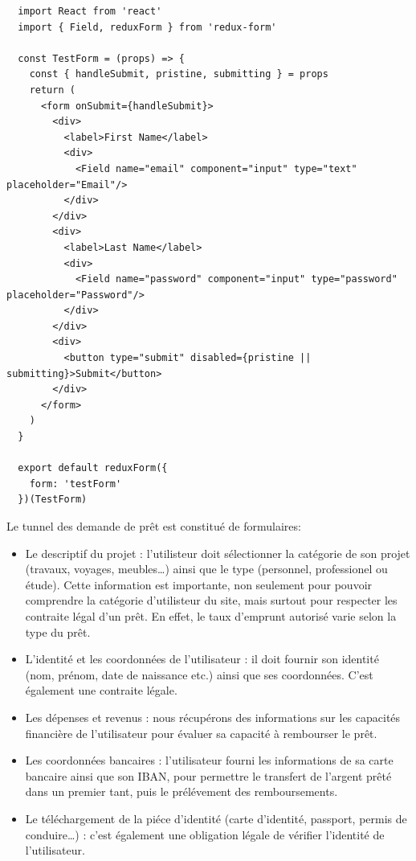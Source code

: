 \documentclass[12pt,a4paper]{article}
\providecommand{\tightlist}{%
  \setlength{\itemsep}{0pt}\setlength{\parskip}{0pt}}
\begin{document}
  \begin{verbatim}
  import React from 'react'
  import { Field, reduxForm } from 'redux-form'

  const TestForm = (props) => {
    const { handleSubmit, pristine, submitting } = props
    return (
      <form onSubmit={handleSubmit}>
        <div>
          <label>First Name</label>
          <div>
            <Field name="email" component="input" type="text" placeholder="Email"/>
          </div>
        </div>
        <div>
          <label>Last Name</label>
          <div>
            <Field name="password" component="input" type="password" placeholder="Password"/>
          </div>
        </div>
        <div>
          <button type="submit" disabled={pristine || submitting}>Submit</button>
        </div>
      </form>
    )
  }

  export default reduxForm({
    form: 'testForm'
  })(TestForm)
  \end{verbatim}

  \bigskip

  Le tunnel des demande de prêt est constitué de formulaires:

  \begin{itemize}
  \tightlist
  \item
    Le descriptif du projet : l'utilisteur doit sélectionner la catégorie
    de son projet (travaux, voyages, meubles\ldots{}) ainsi que le type
    (personnel, professionel ou étude). Cette information est importante,
    non seulement pour pouvoir comprendre la catégorie d'utilisteur du
    site, mais surtout pour respecter les contraite légal d'un prêt. En
    effet, le taux d'emprunt autorisé varie selon la type du prêt.
  \item
    L'identité et les coordonnées de l'utilisateur : il doit fournir son
    identité (nom, prénom, date de naissance etc.) ainsi que ses
    coordonnées. C'est également une contraite légale.
  \item
    Les dépenses et revenus : nous récupérons des informations sur les
    capacités financière de l'utilisateur pour évaluer sa capacité à
    rembourser le prêt.
  \item
    Les coordonnées bancaires : l'utilisateur fourni les informations de
    sa carte bancaire ainsi que son IBAN, pour permettre le transfert de
    l'argent prêté dans un premier tant, puis le prélévement des
    remboursements.
  \item
    Le téléchargement de la piéce d'identité (carte d'identité, passport,
    permis de conduire\ldots{}) : c'est également une obligation légale de
    vérifier l'identité de l'utilisateur.
  \end{itemize}
\end{document}
